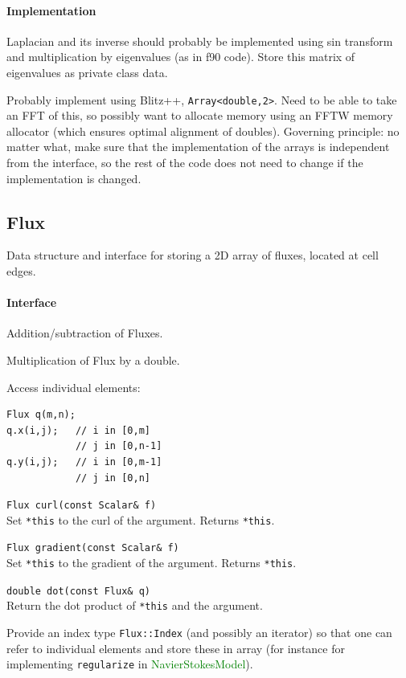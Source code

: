 \documentclass[11pt]{article}
\def\class#1{\textcolor{green}{\ttfamily\small #1}} %
\let\code\lstinline
\begin{document}
\paragraph{Implementation}
Laplacian and its inverse should probably be implemented using sin transform and multiplication by eigenvalues (as in f90 code).  Store this matrix of eigenvalues as private class data.

Probably implement using Blitz++, \code|Array<double,2>|.  Need to be able to take an FFT of this, so possibly want to allocate memory using an FFTW memory allocator (which ensures optimal alignment of doubles).  Governing principle: no matter what, make sure that the implementation of the arrays is independent from the interface, so the rest of the code does not need to change if the implementation is changed.

\subsection{Flux}
Data structure and interface for storing a 2D array of fluxes, located at cell edges.

\paragraph{Interface}
\begin{description}
	\item Addition/subtraction of Fluxes.
	\item Multiplication of Flux by a double.
	\item Access individual elements:
\begin{lstlisting}
Flux q(m,n);
q.x(i,j);   // i in [0,m]
            // j in [0,n-1]
q.y(i,j);   // i in [0,m-1]
		    // j in [0,n]
\end{lstlisting}
	\item \code|Flux curl(const Scalar& f)|\\
	Set \code|*this| to the curl of the argument.  Returns \code|*this|.
	\item \code|Flux gradient(const Scalar& f)|\\
	Set \code|*this| to the gradient of the argument.  Returns \code|*this|.
	\item \code|double dot(const Flux& q)|\\
	Return the dot product of \code|*this| and the argument.
	\item Provide an index type \code|Flux::Index| (and possibly an iterator) so that one can refer to individual elements and store these in array (for instance for implementing \code|regularize| in \class{NavierStokesModel}).
\end{description}
\end{document}
